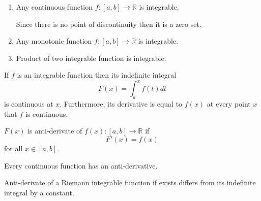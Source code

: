\begin{corollary}
    \leavevmode
    \begin{enumerate}
        \item
              Any continuous function \(f:[a,b] \to \mathbb{R}\) is integrable.
              \begin{prooflemma}
                  Since there is no point of discontinuity then it is a zero set.
              \end{prooflemma}
        \item
              Any monotonic function \(f:[a,b] \to \mathbb{R}\) is integrable.
        \item
              Product of two integrable function is integrable.
    \end{enumerate}
\end{corollary}
\begin{theorem}
    If \(f\) is an integrable function then its indefinite integral
    \begin{equation*}
        F(x) = \int_{a}^{x}{f(t)dt}
    \end{equation*}
    is continuous at \(x\). Furthermore, its derivative is equal to \(f(x)\) at every point \(x\) that \(f\) is continuous.
\end{theorem}
\begin{definition}
    \(F(x)\) is anti-derivate of \(f(x): [a,b] \to \mathbb{R}\) if
    \begin{equation*}
        F'(x) = f(x)
    \end{equation*}
    for all \(x \in [a,b]\).
\end{definition}
\begin{corollary}
    Every continuous function has an anti-derivative.
\end{corollary}
\begin{theorem}
    Anti-derivate of a Riemann integrable function if exists differs from its indefinite integral by a constant.
\end{theorem}
